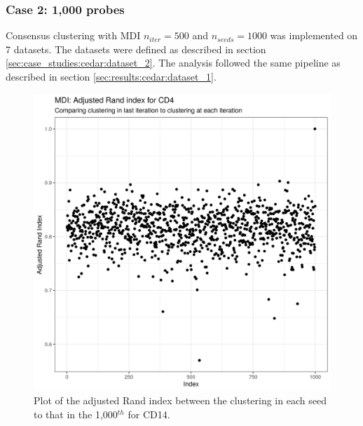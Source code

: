 \documentclass[12pt]{article} %
\begin{document}
%	
	
	\subsubsection{Case 2: 1,000 probes} \label{sec:results:cedar:dataset_2}
	Consensus clustering with MDI $n_{iter}=500$ and $n_{seeds}=1000$ was implemented on 7 datasets. The datasets were defined as described in section \ref{sec:case_studies:cedar:dataset_2}. The analysis followed the same pipeline as described in section \ref{sec:results:cedar:dataset_1}.
	
	\newpage
	
	\begin{figure}[h]
		\centering
		\includegraphics[scale=0.75]{Images/Biology_data/Set_1000/All_datasets/Adjusted_rand_index_plots/rand_index_plot_CD4.png}
		\caption{Plot of the adjusted Rand index between the clustering in each seed to that in the 1,000$^{th}$ for CD14.}
		\label{fig:results:cedar_2:mdi_cd4_adj_rand_ind_plot}
	\end{figure}
	
\end{document}
